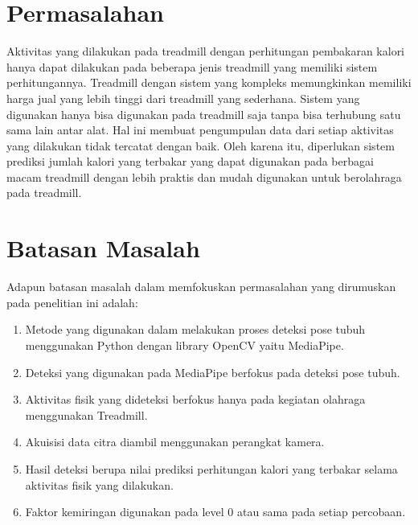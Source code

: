 \section{Permasalahan}
\label{sec:permasalahan}

Aktivitas yang dilakukan pada treadmill dengan perhitungan pembakaran kalori hanya dapat dilakukan pada beberapa jenis treadmill yang memiliki sistem perhitungannya. Treadmill dengan sistem yang kompleks memungkinkan memiliki harga jual yang lebih tinggi dari treadmill yang sederhana. Sistem yang digunakan hanya bisa digunakan pada treadmill saja tanpa bisa terhubung satu sama lain antar alat. Hal ini membuat pengumpulan data dari setiap aktivitas yang dilakukan tidak tercatat dengan baik. Oleh karena itu, diperlukan sistem prediksi jumlah kalori yang terbakar yang dapat digunakan pada berbagai macam treadmill dengan lebih praktis dan mudah digunakan untuk berolahraga pada treadmill. 


\section{Batasan Masalah}
\label{sec:batasanmasalah}

Adapun batasan masalah dalam memfokuskan permasalahan yang dirumuskan pada penelitian ini adalah:

\begin{enumerate}[nolistsep]

  \item Metode yang digunakan dalam melakukan proses deteksi pose tubuh menggunakan Python dengan library OpenCV yaitu MediaPipe.

  \item Deteksi yang digunakan pada MediaPipe berfokus pada deteksi pose tubuh.

  \item Aktivitas fisik yang dideteksi berfokus hanya pada kegiatan olahraga menggunakan Treadmill.

  \item Akuisisi data citra diambil menggunakan perangkat kamera.

  \item Hasil deteksi berupa nilai prediksi perhitungan kalori yang terbakar selama aktivitas fisik yang dilakukan.

  \item Faktor kemiringan digunakan pada level 0 atau sama pada setiap percobaan.

\end{enumerate}

